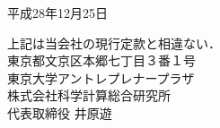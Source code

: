 \documentclass[11pt,a4paper,uplatex]{jsarticle}
\begin{document}
\vspace{20pt}
\begin{flushright}
平成28年12月25日\\
\vspace{10pt}

上記は当会社の現行定款と相違ない．\\
\vspace{10pt}
東京都文京区本郷七丁目３番１号\\
東京大学アントレプレナープラザ\\
株式会社科学計算総合研究所\\
代表取締役 井原遊
\end{flushright}
\end{document}
